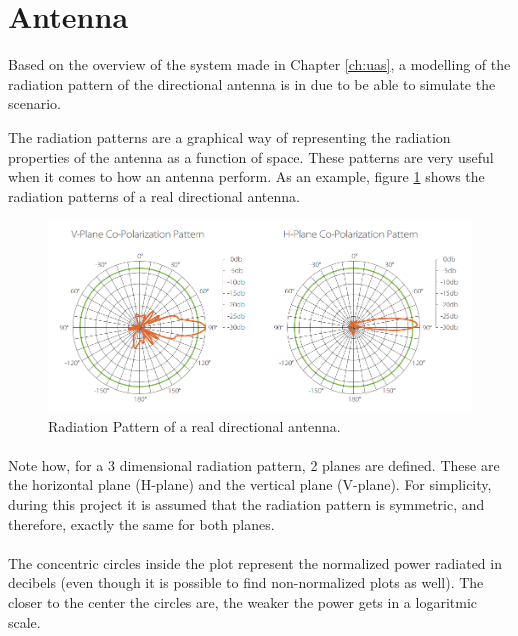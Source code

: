 \section{Antenna}\label{sec:antenna}

Based on the overview of the system made in Chapter \ref{ch:uas}, a modelling of the radiation pattern of the directional antenna is in due to be able to simulate the scenario.

The radiation patterns are a graphical way of representing the radiation properties of the antenna as a function of space. These patterns are very useful when it comes to how an antenna perform. As an example, figure \ref{fig:radpattern} shows the radiation patterns of a real directional antenna.

\begin{figure}[H]
	\centerline{
	\includegraphics[scale=0.45]{figures/radpattern.png}}
	\caption{Radiation Pattern of a real directional antenna.}
	\label{fig:radpattern}
\end{figure}

\paragraph{}Note how, for a 3 dimensional radiation pattern, 2 planes are defined. These are the horizontal plane (H-plane) and the vertical plane (V-plane). For simplicity, during this project it is assumed that the radiation pattern is symmetric, and therefore, exactly the same for both planes.

\paragraph{}The concentric circles inside the plot represent the normalized power radiated in decibels (even though it is possible to find non-normalized plots as well). The closer to the center the circles are, the weaker the power gets in a logaritmic scale.

